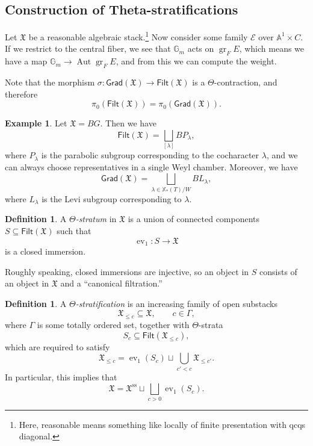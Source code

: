 \documentclass{amsart}
\theoremstyle{definition}
\newtheorem{defn}[thm]{Definition}
\newtheorem{exm}[thm]{Example}
\theoremstyle{remark}
\theoremstyle{plain}
\theoremstyle{definition}
\theoremstyle{remark}
\newcommand{\A}{\mathbb{A}}
\newcommand{\G}{\mathbb{G}}
\newcommand{\mc}[1]{\mathcal{#1}}
\newcommand{\mf}[1]{\mathfrak{#1}}
\newcommand{\mr}[1]{\mathrm{#1}}
\newcommand{\on}[1]{\operatorname{#1}}
\newcommand{\ms}[1]{\mathsf{#1}}
\newcommand{\1}{\mathbf{1}}
\newcommand{\2}{\mathbf{2}}
\newcommand{\3}{\mathbf{3}}
\DeclareMathOperator{\Aut}{Aut}
\DeclareMathOperator{\ev}{ev}
\begin{document}
\subsection{Construction of Theta-stratifications}%
\label{sub:Construction of Theta-stratifications}

Let \(\mf{X}\) be a reasonable algebraic stack.\footnote{Here, reasonable means something like locally of finite presentation with qcqs diagonal.} Now consider some family \(\mc{E}\) over \(\A^1 \times C\). If we restrict to the central fiber, we see that \(\G_m\) acts on \(\on{gr}_F E\), which means we have a map \(\G_m \to \Aut \on{gr}_F E\), and from this we can compute the weight. 

Note that the morphism \(\sigma \colon \ms{Grad}(\mf{X}) \to \ms{Filt}(\mf{X})\) is a \(\Theta\)-contraction, and therefore
\[ \pi_0(\ms{Filt}(\mf{X})) = \pi_0(\ms{Grad}(\mf{X})). \]

\begin{exm}
    Let \(\mf{X} = BG\). Then we have
    \[\ms{Filt}(\mf{X}) = \bigsqcup_{[\lambda]} B P_{\lambda}, \]
    where \(P_{\lambda}\) is the parabolic subgroup corresponding to the cocharacter \(\lambda\), and we can always choose representatives in a single Weyl chamber. Moreover, we have
    \[ \ms{Grad}(\mf{X}) = \bigsqcup_{\lambda \in \mathbb{X}_*(T)/W} B L_{\lambda}, \]
    where \(L_{\lambda}\) is the Levi subgroup corresponding to \(\lambda\).
\end{exm}

\begin{defn}
    A \textit{\(\Theta\)-stratum} in \(\mf{X}\) is a union of connected components \(S \subseteq \ms{Filt}(\mf{X})\) such that
    \[ \ev_1 \colon S \to \mf{X} \]
    is a closed immersion.
\end{defn}

Roughly speaking, closed immersions are injective, so an object in \(S\) consists of an object in \(\mf{X}\) and a ``canonical filtration.''

\begin{defn}
    A \textit{\(\Theta\)-stratification} is an increasing family of open substacks
    \[ \mf{X}_{\leq c} \subseteq \mf{X}, \qquad c \in \Gamma, \]
    where \(\Gamma\) is some totally ordered set, together with \(\Theta\)-strata
    \[ S_c \subseteq \ms{Filt}(\mf{X}_{\leq c}), \]
    which are required to satisfy
    \[ \mf{X}_{\leq c} = \ev_1(S_c) \sqcup \bigcup_{c' < c} \mf{X}_{\leq c'}. \]
    In particular, this implies that
    \[ \mf{X} = \mf{X}^{\mr{ss}} \sqcup \bigsqcup_{c > 0} \ev_1(S_c). \]
\end{defn}
\end{document}
